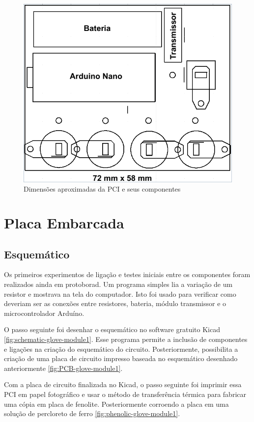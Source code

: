 \documentclass{ufpatcc}
\begin{document}
		\begin{figure}[h!]
  		\label{fig:size-glove-module-tx1}
			\centering
  		\includegraphics[scale=0.5]{../pictures/size-glove-module-tx1.png}
			\caption{Dimensões aproximadas da PCI e seus componentes}
		\end{figure}

		\section{Placa Embarcada}
			\subsection{Esquemático}

			Os primeiros experimentos de ligação e testes iniciais entre os componentes foram realizados ainda em protoborad. Um programa simples lia a variação de um resistor e mostrava na tela do computador. Isto foi usado para verificar como deveriam ser as conexões entre resistores, bateria, módulo transmissor e o microcontrolador Arduíno.

			O passo seguinte foi desenhar o esquemático no software gratuito Kicad \ref{fig:schematic-glove-module1}. Esse programa permite a inclusão de componentes e ligações na criação do esquemático do circuito. Posteriormente, possibilita a criação de uma placa de circuito impresso baseada no esquemático desenhado anteriormente  \ref{fig:PCB-glove-module1}.

			Com a placa de circuito finalizada no Kicad, o passo seguinte foi imprimir essa PCI em papel fotográfico e usar o método de transferência térmica para fabricar uma cópia em placa de fenolite. Posteriormente corroendo a placa em uma solução de percloreto de ferro \ref{fig:phenolic-glove-module1}.
\end{document}
